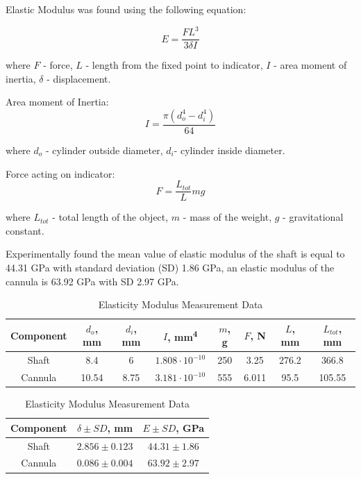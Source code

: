 Elastic Modulus was found using the following equation:

\begin{equation}
E = \frac{FL^3}{3 \delta I} 
\end{equation}

where $F$ - force, $L$ - length from the fixed point to indicator, $I$ - area moment of inertia, $\delta$ - displacement.

Area moment of Inertia: 
\begin{equation}
I = \frac{\pi (d_o^4 - d_i^4)}{64}
\end{equation}

where $d_o$ - cylinder outside diameter, $d_i$- cylinder inside diameter.

Force acting on indicator:
\begin{equation}
F = \frac{L_{tot}}{L}mg
\end{equation}

where $L_{tot}$ - total length of the object, $m$ - mass of the weight, $g$ - gravitational constant.

Experimentally found the mean value of elastic modulus of the shaft is equal to 44.31 GPa with standard deviation (SD) 1.86 GPa, an elastic modulus of the cannula is 63.92 GPa with SD 2.97 GPa.

\begin{table}[h]
\caption {Elasticity Modulus Measurement Data} \label{tab:elasMod} 
\begin{tabular}{ | c | c | c | c | c | c | c | c | } 
\hline
Component & $d_o$, mm & $d_i$, mm & $I$, mm\textsuperscript{4} & $m$, g & $F$, N & $L$, mm & $L_{tot}$, mm \\ 
\hline
Shaft & 8.4 & 6 & $1.808 \cdot 10^{-10}$ & 250 & 3.25 & 276.2 & 366.8\\ 
\hline
Cannula & 10.54 & 8.75 & $3.181 \cdot 10^{-10}$ & 555 & 6.011 & 95.5 & 105.55 \\ 
\hline
\end{tabular}

\begin{tabular}{ | c | c | c | } 
\hline
Component & $\delta \pm SD$, mm & $E \pm SD$, GPa \\ 
\hline
Shaft & $2.856 \pm 0.123$ & $44.31 \pm 1.86$ \\ 
\hline
Cannula & $0.086 \pm 0.004$ & $63.92 \pm 2.97$ \\ 
\hline
\end{tabular}
\end{table}

